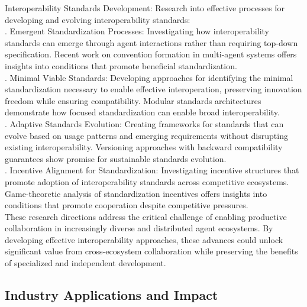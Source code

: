 Interoperability Standards Development: Research into effective processes for developing and evolving interoperability standards:\\ . Emergent Standardization Processes: Investigating how interoperability standards can emerge through agent interactions rather than requiring top-down specification. Recent work on convention formation in multi-agent systems offers insights into conditions that promote beneficial standardization.\\ . Minimal Viable Standards: Developing approaches for identifying the minimal standardization necessary to enable effective interoperation, preserving innovation freedom while ensuring compatibility. Modular standards architectures demonstrate how focused standardization can enable broad interoperability.\\ . Adaptive Standards Evolution: Creating frameworks for standards that can evolve based on usage patterns and emerging requirements without disrupting existing interoperability. Versioning approaches with backward compatibility guarantees show promise for sustainable standards evolution.\\ . Incentive Alignment for Standardization: Investigating incentive structures that promote adoption of interoperability standards across competitive ecosystems. Game-theoretic analysis of standardization incentives offers insights into conditions that promote cooperation despite competitive pressures.\\ \newline
These research directions address the critical challenge of enabling productive collaboration in increasingly diverse and distributed agent ecosystems. By developing effective interoperability approaches, these advances could unlock significant value from cross-ecosystem collaboration while preserving the benefits of specialized and independent development.\\
\subsection{Industry Applications and Impact}
